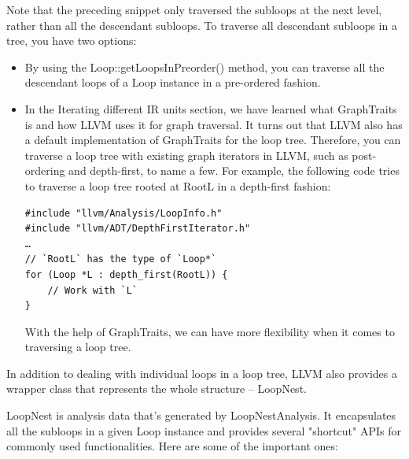 Note that the preceding snippet only traversed the subloops at the next level, rather than all the descendant subloops. To traverse all descendant subloops in a tree, you have two options:

\begin{itemize}
\item By using the Loop::getLoopsInPreorder() method, you can traverse all the descendant loops of a Loop instance in a pre-ordered fashion.

\item In the Iterating different IR units section, we have learned what GraphTraits is and how LLVM uses it for graph traversal. It turns out that LLVM also has a  default implementation of GraphTraits for the loop tree. Therefore, you can traverse a loop tree with existing graph iterators in LLVM, such as post-ordering and depth-first, to name a few. For example, the following code tries to traverse a loop tree rooted at RootL in a depth-first fashion:

\begin{lstlisting}[style=styleCXX]
#include "llvm/Analysis/LoopInfo.h"
#include "llvm/ADT/DepthFirstIterator.h"
…
// `RootL` has the type of `Loop*`
for (Loop *L : depth_first(RootL)) {
	// Work with `L`
}
\end{lstlisting}

With the help of GraphTraits, we can have more flexibility when it comes to traversing a loop tree.

\end{itemize}

In addition to dealing with individual loops in a loop tree, LLVM also provides a wrapper class that represents the whole structure – LoopNest. 

LoopNest is analysis data that's generated by LoopNestAnalysis. It encapsulates all the subloops in a given Loop instance and provides several "shortcut" APIs for commonly used functionalities. Here are some of the important ones:

